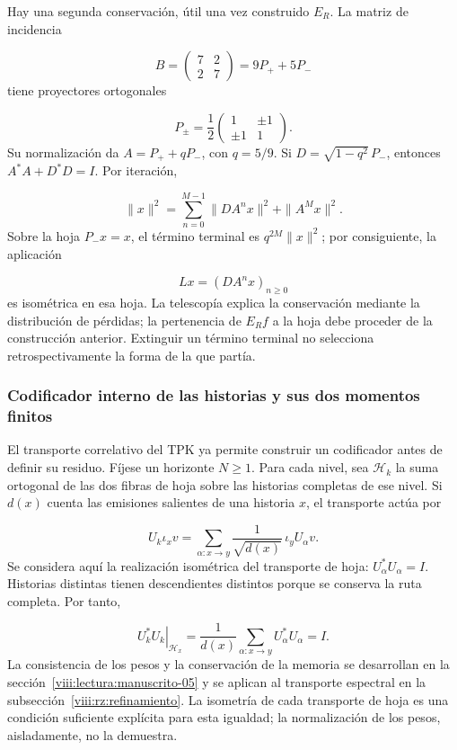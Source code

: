 Hay una segunda conservación, útil una vez construido \(E_R\). La matriz de incidencia

\[
B=\begin{pmatrix}7&2\\2&7\end{pmatrix}=9P_++5P_-
\]
tiene proyectores ortogonales

\[
P_\pm=\frac12
\begin{pmatrix}1&\pm1\\\pm1&1\end{pmatrix}.
\]
Su normalización da \(A=P_++qP_-\), con \(q=5/9\). Si \(D=\sqrt{1-q^2}\,P_-\), entonces \(A^*A+D^*D=I\). Por iteración,

\[
\|x\|^2=\sum_{n=0}^{M-1}\|DA^nx\|^2+\|A^Mx\|^2.
\]
Sobre la hoja \(P_-x=x\), el término terminal es \(q^{2M}\|x\|^2\); por consiguiente, la aplicación

\[
Lx=(DA^nx)_{n\geq0}
\]
es isométrica en esa hoja. La telescopía explica la conservación mediante la distribución de pérdidas; la pertenencia de \(E_Rf\) a la hoja debe proceder de la construcción anterior. Extinguir un término terminal no selecciona retrospectivamente la forma de la que partía.

\subsubsection*{Codificador interno de las historias y sus dos momentos finitos}
El transporte correlativo del TPK ya permite construir un codificador antes de definir su residuo. Fíjese un horizonte \(N\geq1\). Para cada nivel, sea \(\mathscr H_k\) la suma ortogonal de las dos fibras de hoja sobre las historias completas de ese nivel. Si \(d(x)\) cuenta las emisiones salientes de una historia \(x\), el transporte actúa por

\[
U_k\iota_xv=
\sum_{\alpha:x\to y}\frac1{\sqrt{d(x)}}\,\iota_yU_\alpha v.
\]
Se considera aquí la realización isométrica del transporte de hoja: \(U_\alpha^*U_\alpha=I\). Historias distintas tienen descendientes distintos porque se conserva la ruta completa. Por tanto,

\[
\left.U_k^*U_k\right|_{\mathscr H_x}
=\frac1{d(x)}\sum_{\alpha:x\to y}U_\alpha^*U_\alpha=I.
\]
La consistencia de los pesos y la conservación de la memoria se desarrollan en la sección~\ref{viii:lectura:manuscrito-05} y se aplican al transporte espectral en la subsección~\ref{viii:rz:refinamiento}. La isometría de cada transporte de hoja es una condición suficiente explícita para esta igualdad; la normalización de los pesos, aisladamente, no la demuestra.

